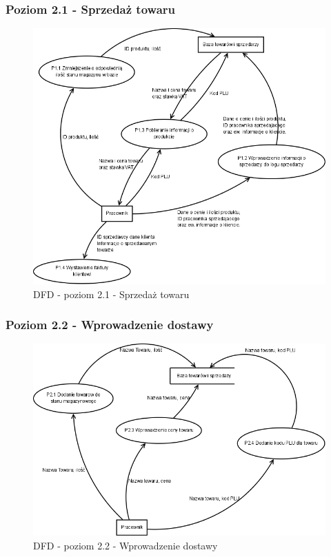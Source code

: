 \subsubsection{Poziom 2.1 - Sprzedaż towaru}
\begin{figure}[h]
\includegraphics[width=1\textwidth]{gfx/dfd-2-1.png}
\caption{DFD - poziom 2.1 - Sprzedaż towaru}
\end{figure}
\clearpage
\subsubsection{Poziom 2.2 - Wprowadzenie dostawy}
\begin{figure}[h]
\includegraphics[width=1\textwidth]{gfx/dfd-2-2.png}
\caption{DFD - poziom 2.2 - Wprowadzenie dostawy}
\end{figure}
\clearpage
